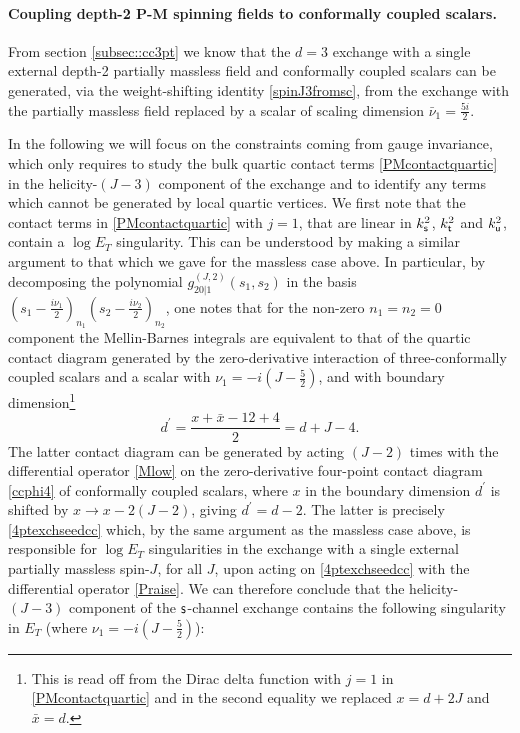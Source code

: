 \documentclass[11pt,a4paper]{article}
\begin{document}
\paragraph{Coupling depth-2 P-M spinning fields to conformally coupled scalars.} From section \ref{subsec::cc3pt} we know that the $d=3$ exchange with a single external depth-2 partially massless field and conformally coupled scalars can be generated, via the weight-shifting identity \eqref{spinJ3fromsc}, from the exchange with the partially massless field replaced by a scalar of scaling dimension ${\bar \nu_1}=\frac{5i}{2}$. 

In the following we will focus on the constraints coming from gauge invariance, which only requires to study the bulk quartic contact terms \eqref{PMcontactquartic} in the helicity-$\left(J-3\right)$ component of the exchange and to identify any terms which cannot be generated by local quartic vertices. We first note that the contact terms in \eqref{PMcontactquartic} with $j=1$, that are linear in $k^2_{\sf s}$, $k^2_{\sf t}$ and $k^2_{\sf u}$, contain a $\log E_T$ singularity. This can be understood by making a similar argument to that which we gave for the massless case above. In particular, by decomposing the polynomial $g^{\left(J,2\right)}_{20|1}\left(s_1,s_2\right)$ in the basis $\left(s_1-\tfrac{i\nu_1}{2}\right)_{n_1}\left(s_2-\tfrac{i\nu_2}{2}\right)_{n_2}$, one notes that for the non-zero $n_1=n_2=0$ component the Mellin-Barnes integrals are equivalent to that of the quartic contact diagram generated by the zero-derivative interaction of three-conformally coupled scalars and a scalar with $\nu_1=-i\left(J-\tfrac{5}{2}\right)$, and with boundary dimension\footnote{This is read off from the Dirac delta function with $j=1$ in \eqref{PMcontactquartic} and in the second equality we replaced $x=d+2J$ and ${\bar x}=d$.}
\begin{equation}
  d^\prime=\frac{x+{\bar x}-12+4}{2}=d+J-4.
\end{equation} 
The latter contact diagram can be generated by acting $\left(J-2\right)$ times with the differential operator \eqref{Mlow} on the zero-derivative four-point contact diagram \eqref{ccphi4} of conformally coupled scalars, where $x$ in the boundary dimension $d^\prime$ is shifted by $x \to x-2\left(J-2\right)$, giving $d^\prime=d-2$. The latter is precisely \eqref{4ptexchseedcc} which, by the same argument as the massless case above, is responsible for $\log E_T$ singularities in the exchange with a single external partially massless spin-$J$, for all $J$, upon acting on \eqref{4ptexchseedcc} with the differential operator \eqref{Praise}. We can therefore conclude that the helicity-$\left(J-3\right)$ component of the ${\sf s}$-channel exchange contains the following singularity in $E_T$ (where $\nu_1=-i\left(J-\tfrac{5}{2}\right)$):
\end{document}
